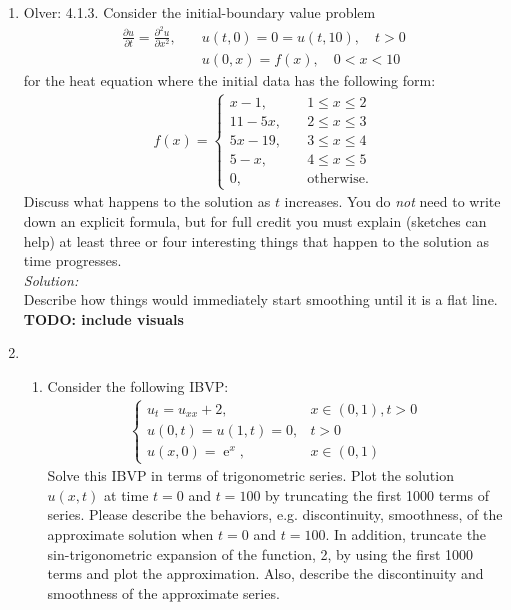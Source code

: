 \documentclass[10pt]{amsart}
\DeclareMathOperator{\E}{e}
\theoremstyle{nonumberplain}
\begin{document}
\begin{enumerate}[label={\bf {\arabic*}:}]
\item Olver: 4.1.3. Consider the initial-boundary value problem
\begin{align*}
\frac {\partial u} {\partial t} = \frac {\partial^2 u}{ \partial x^2}, \quad &u(t, 0) = 0 = u(t, 10), \quad t > 0 \\
	& u(0, x) = f(x), \quad 0 < x < 10
\end{align*}
for the heat equation where the initial data has the following form:
\begin{align*}
f(x) = \begin{cases}
x - 1, \quad &1 \leq x \leq 2 \\
11 - 5x, \quad & 2 \leq x \leq 3 \\
5x - 19, \quad & 3 \leq x \leq 4 \\
5 - x, \quad & 4 \leq x \leq 5 \\
0, \quad &\text{otherwise}.
\end{cases}
\end{align*}
Discuss what happens to the solution as $t$ increases.
You do \textit{not} need to write down an explicit formula, but for full credit you must explain (sketches can help) at least three or four interesting things that happen to the solution as time progresses.
\\

\noindent
\textit{Solution:} \\
Describe how things would immediately start smoothing until it is a flat line. \textbf{TODO: include visuals} 

\newpage

\item
\begin{enumerate}
\item Consider the following IBVP:
\begin{align*}
\begin{cases}
u_t = u_{xx} + 2, &x \in (0, 1), t > 0 \\
u(0, t) = u(1, t) = 0, & t > 0 \\
u(x, 0) = \E^{x}, &x \in (0, 1)
\end{cases}
\end{align*}
Solve this IBVP in terms of trigonometric series.
Plot the solution $u(x, t)$ at time $t=0$ and $t=100$ by truncating the first 1000 terms of series.
Please describe the behaviors, e.g. discontinuity, smoothness, of the approximate solution when $t=0$ and $t=100$.
In addition, truncate the sin-trigonometric expansion of the function, 2,  by using the first 1000 terms and plot the approximation.
Also, describe the discontinuity and smoothness of the approximate series.


\end{enumerate}
\end{enumerate}
\end{document}
